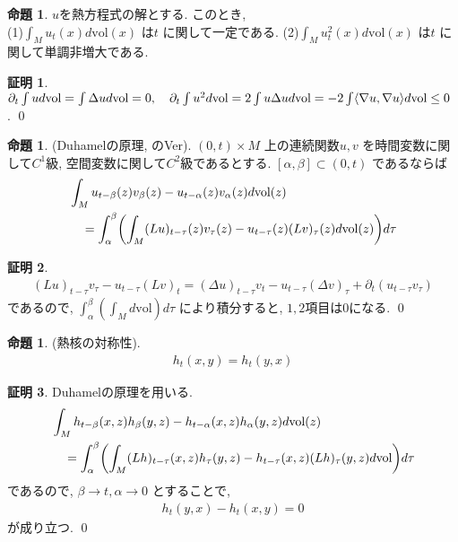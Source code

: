 \documentclass[10pt, fleqn, label-section=none]{bxjsarticle}
\theoremstyle{definition}
\newtheorem{prop}[dfn]{命題}
\newtheorem*{pf*}{証明}
\newcommand{\paren}[1]{\mleft( #1\mright )}
\newcommand{\tbra}[1]{\mleft\langle#1\mright\rangle}
\newcommand{\vol}{\textrm{vol}}
\renewcommand{\-}{\hyphen}
\begin{document}
\begin{prop}$u$を熱方程式の解とする. このとき, \\
(1)$\int_M u_t (x) d\vol(x)$ は$t$ に関して一定である. (2)$\int_M u^2_t (x) d \vol (x)$ は$t$ に関して単調非増大である.
\end{prop}
\begin{pf*}
$\partial_t \int u d \vol = \int \Delta u d \vol = 0, \quad \partial_t \int u^2 d \vol = 2 \int u \Delta u d \vol = - 2  \int \tbra{\nabla u, \nabla u} d \vol \leq 0$ .
\qed
\end{pf*}

\begin{prop}(Duhamelの原理, のVer).
$(0,t) \times M$ 上の連続関数$u,v$ を時間変数に関して$C^1$級, 空間変数に関して$C^2$級であるとする. $[\alpha, \beta] \subset (0,t)$ であるならば
\begin{align*} &\int_M u_{t - \beta} (z) v_\beta (z) - u_{t -\alpha} (z) v_\alpha (z) d\vol(z) \\ &\quad = \int_\alpha^\beta \paren {\int_M (Lu)_{t - \tau} (z) v_\tau (z) - u_{t-\tau}(z)(Lv)_\tau (z) d \vol(z) } d \tau \end{align*}
\end{prop}
\begin{pf*}
\begin{align*} (Lu)_{t - \tau} v_\tau - u_{t- \tau} (Lv)_t = (\Delta u)_{t- \tau} v_t - u_{t- \tau} (\Delta v)_\tau + \partial_t (u_{t-\tau} v_\tau)\end{align*}
であるので, $\int_\alpha^\beta(\int_M d \vol) d \tau$ により積分すると, $1,2$項目は$0$になる. 
\qed
\end{pf*}

\begin{prop}(熱核の対称性).
\begin{align*} h_t (x,y) = h_t (y,x) \end{align*}
\end{prop}
\begin{pf*}
Duhamelの原理を用いる.
\begin{align*} &\int_M h_{t - \beta} (x, z) h_\beta (y, z) - h_{t -\alpha} (x, z) h_\alpha (y, z) d\vol(z)
\\ &\quad = \int_\alpha^\beta \paren {\int_M (Lh)_{t - \tau} (x, z) h_\tau (y, z) - h_{t-\tau}(x, z)(Lh)_\tau (y, z) d \vol } d \tau  \end{align*}
であるので, $\beta \rightarrow t, \alpha \rightarrow 0$ とすることで, 
\begin{align*} h_t( y,x) - h_t (x,y) = 0 \end{align*} 
が成り立つ.
\qed
\end{pf*}
\end{document}
